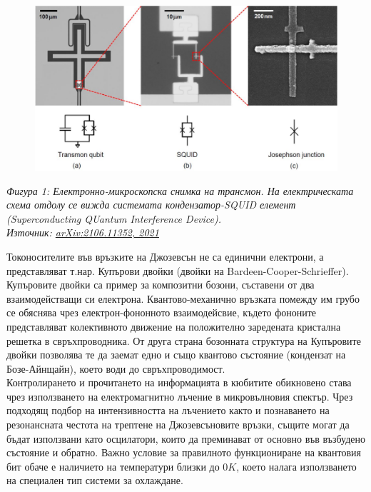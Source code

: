     \begin{figure}[H]
        \centering
        \includegraphics[width=370pt]{3.png}
    \end{figure}
    \begin{center}
        \small \textit{Фигура 1: Електронно-микроскопска снимка на трансмон. На електрическата схема отдолу се вижда системата кондензатор-SQUID елемент (Superconducting QUantum Interference Device).\\
        Източник: \href{https://arxiv.org/pdf/2106.11352.pdf}{arXiv:2106.11352, 2021}} \cite{roth2021introduction}
    \end{center}
    

    Токоносителите във връзките на Джозевсън не са единични електрони, а представляват т.нар. Купърови двойки (двойки на Bardeen-Cooper-Schrieffer).
    Купъровите двойки са пример за композитни бозони, съставени от два взаимодействащи си електрона. Квантово-механично връзката помежду им грубо се обяснява
    чрез електрон-фононното взаимодейсвие, където фононите представляват колективното движение на положително заредената кристална решетка
    в свръхпроводника. От друга страна бозонната структура на Купъровите двойки позволява те да заемат едно и също квантово състояние (кондензат на
    Бозе-Айнщайн), което води до свръхпроводимост.\\
    Контролирането и прочитането на информацията в кюбитите обикновено става чрез използването на електромагнитно лъчение в микровълновия спектър.
    Чрез подходящ подбор на интензивността на лъчението както и познаването на резонансната честота на трептене на Джозевсъновите връзки, същите
    могат да бъдат използвани като осцилатори, които да преминават от основно във възбудено състояние и обратно.
    Важно условие за правилното функциониране на квантовия бит обаче е наличието на температури близки до $0 K$, което налага използването на
    специален тип системи за охлаждане.

